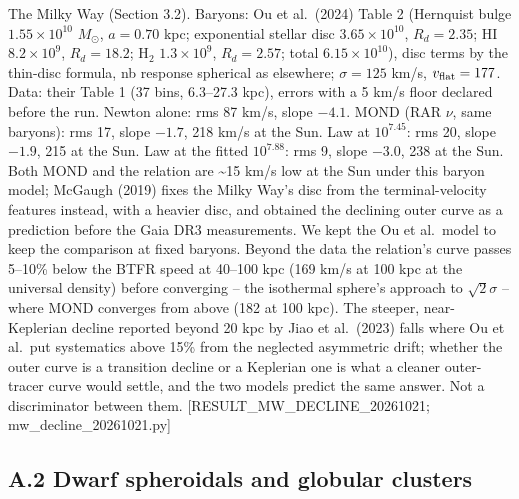 \documentclass[
  10pt,
]{article}
\begin{document}
The Milky Way (Section 3.2). Baryons: Ou et al.~(2024) Table 2 (Hernquist bulge $1.55\times10^{10}$ $M_\odot$, $a=0.70$ kpc; exponential stellar disc $3.65\times10^{10}$, $R_d=2.35$; HI $8.2\times10^{9}$, $R_d=18.2$; H$_2$ $1.3\times10^{9}$, $R_d=2.57$; total $6.15\times10^{10}$), disc terms by the thin-disc formula, nb response spherical as elsewhere; $\sigma=125$ km/s, $v_{\rm flat}=177$. Data: their Table 1 (37 bins, 6.3--27.3 kpc), errors with a 5 km/s floor declared before the run. Newton alone: rms 87 km/s, slope $-4.1$. MOND (RAR $\nu$, same baryons): rms 17, slope $-1.7$, 218 km/s at the Sun. Law at $10^{7.45}$: rms 20, slope $-1.9$, 215 at the Sun. Law at the fitted $10^{7.88}$: rms 9, slope $-3.0$, 238 at the Sun. Both MOND and the relation are \textasciitilde{}15 km/s low at the Sun under this baryon model; McGaugh (2019) fixes the Milky Way's disc from the terminal-velocity features instead, with a heavier disc, and obtained the declining outer curve as a prediction before the Gaia DR3 measurements. We kept the Ou et al.\ model to keep the comparison at fixed baryons. Beyond the data the relation's curve passes 5--10\% below the BTFR speed at 40--100 kpc (169 km/s at 100 kpc at the universal density) before converging -- the isothermal sphere's approach to $\sqrt{2}\sigma$ -- where MOND converges from above (182 at 100 kpc). The steeper, near-Keplerian decline reported beyond 20 kpc by Jiao et al.~(2023) falls where Ou et al.\ put systematics above 15\% from the neglected asymmetric drift; whether the outer curve is a transition decline or a Keplerian one is what a cleaner outer-tracer curve would settle, and the two models predict the same answer. Not a discriminator between them. {[}RESULT\_MW\_DECLINE\_20261021; mw\_decline\_20261021.py{]}

\subsection{A.2 Dwarf spheroidals and globular clusters}\label{dwarf-spheroidals-and-globular-clusters}
\end{document}
